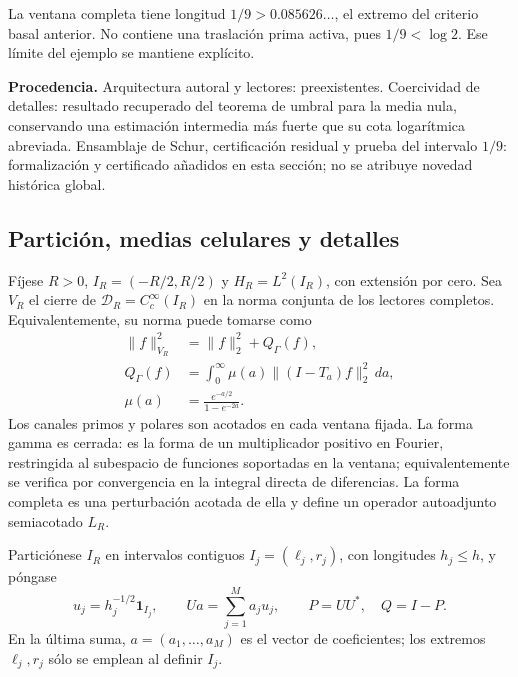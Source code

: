 La ventana completa tiene longitud \(1/9>0.085626\ldots\), el extremo
del criterio basal anterior. No contiene una traslación prima activa,
pues \(1/9<\log2\). Ese límite del ejemplo se mantiene explícito.

\textbf{Procedencia.} Arquitectura autoral y lectores: preexistentes. Coercividad
de detalles: resultado recuperado del teorema de umbral para la media nula, conservando una estimación
intermedia más fuerte que su cota logarítmica abreviada. Ensamblaje de Schur,
certificación residual y prueba del intervalo \(1/9\): formalización y
certificado añadidos en esta sección; no se atribuye novedad histórica global.

\subsection{Partición, medias celulares y detalles}
\label{schur-add-sub-46}

Fíjese \(R>0\), \(I_R=(-R/2,R/2)\) y \(H_R=L^2(I_R)\), con extensión
por cero. Sea \(V_R\) el cierre de \(\mathcal D_R=C_c^\infty(I_R)\) en la
norma conjunta de los lectores completos. Equivalentemente, su norma puede tomarse como
\begin{equation}
\begin{aligned}
\|f\|_{V_R}^2&=\|f\|_2^2+Q_\Gamma(f),\\
Q_\Gamma(f)&=\int_0^\infty\mu(a)\|(I-T_a)f\|_2^2\,da,\\
\mu(a)&=\frac{e^{-a/2}}{1-e^{-2a}}.
\end{aligned}
\label{schur-add-display-2}
\end{equation}
Los canales primos y polares son acotados en cada ventana fijada.
La forma gamma es cerrada: es la forma de un multiplicador positivo
en Fourier, restringida al subespacio de funciones soportadas en la
ventana; equivalentemente se verifica por convergencia en la integral
directa de diferencias. La forma completa es una perturbación acotada
de ella y define un operador autoadjunto semiacotado \(L_R\).

Particiónese \(I_R\) en intervalos contiguos \(I_j=(\ell_j,r_j)\), con
longitudes \(h_j\leq h\), y póngase
\begin{equation}
u_j=h_j^{-1/2}\mathbf1_{I_j},\qquad
Ua=\sum_{j=1}^M a_j u_j,\qquad P=UU^*,\quad Q=I-P.
\label{schur-add-display-3}
\end{equation}
En la última suma, \(a=(a_1,\ldots,a_M)\) es el vector de coeficientes;
los extremos \(\ell_j,r_j\) sólo se emplean al definir \(I_j\).

